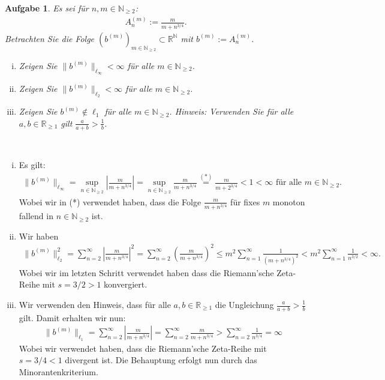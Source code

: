 \documentclass[a4paper, 20]{exam}
\newtheorem{ex}{Aufgabe}
\begin{document}
\begin{ex} Es sei für $n,m \in \mathbb{N}_{ \geq 2}$:
\begin{align*}
A_n^{(m)}:= \frac{m}{m+n^{3/4}}.
\end{align*}
Betrachten Sie die Folge $(b^{(m)})_{m \in \mathbb{N}_{ \geq 2}} \subset \mathbb{R}^\mathbb{N}$ mit $b^{(m)}:= A_n^{(m)}$. 
\begin{enumerate}[i)]
\item Zeigen Sie $\|b^{(m)}\|_{ \ell_\infty} < \infty$ für alle $m \in \mathbb{N}_{ \geq 2}$. 
\item Zeigen Sie $\| b^{(m)}\|_{ \ell_2} < \infty$ für alle $m \in \mathbb{N}_{ \geq 2}$. 
\item Zeigen Sie $b^{(m)} \notin \ell_1$ für alle $m \in \mathbb{N}_{ \geq 2}$. Hinweis: Verwenden Sie für alle $a,b \in \mathbb{R}_{ \geq 1}$ gilt  $\frac{a}{a+b} > \frac{1}{b}.$
\end{enumerate}
\end{ex}

\begin{solution} \
\begin{enumerate}[i)]
\item Es gilt:
\begin{align*}
\|b^{(m)}\|_{ \ell_\infty} = \sup_{n \in \mathbb{N}_{ \geq 2}} \left| \frac{m}{m+n^{3/4}}\right| = \sup_{n \in \mathbb{N}_{ \geq 2}} \frac{m}{m+n^{3/4}} \overset{(*)}= \frac{m}{m+2^{3/4}}<1< \infty \text{ für alle }m \in \mathbb{N}_{ \geq 2}.
\end{align*}
Wobei wir in (*) verwendet haben, dass die Folge $\frac{m}{m+n^{3/4}}$ für fixes $m$ monoton fallend in $n \in \mathbb{N}_{ \geq 2}$ ist. 
\item Wir haben 
\begin{align*}
\|b^{(m)}\|_{ \ell_2}^2 = \sum_{n=2}^\infty \left| \frac{m}{m+n^{3/4}}\right|^2 = \sum_{n=2}^\infty \left( \frac{m}{m+n^{3/4}}\right)^2 \leq m^2 \sum_{n=1}^\infty \frac{1}{(m+n^{3/4})^2}< m^2 \sum_{n=1}^\infty \frac{1}{n^{3/2}}< \infty.
\end{align*}
Wobei wir im letzten Schritt verwendet haben dass die Riemann'sche Zeta-Reihe mit $s=3/2 >1$ konvergiert. 
\item Wir verwenden den Hinweis, dass für alle $a,b \in \mathbb{R}_{ \geq 1}$ die Ungleichung $\frac{a}{a+b}> \frac{1}{b}$ gilt. Damit erhalten wir nun:
\begin{align*}
\|b^{(m)}\|_{ \ell_1} = \sum_{n=2}^\infty \left| \frac{m}{m+n^{3/4}}\right| = \sum_{n=2}^\infty \frac{m}{m+n^{3/4}}> \sum_{n=2}^\infty \frac{1}{n^{3/4}} = \infty
\end{align*}
Wobei wir verwendet haben, dass die Riemann'sche Zeta-Reihe mit $s=3/4 < 1$ divergent ist. Die Behauptung erfolgt nun durch das Minorantenkriterium. 
\end{enumerate}
\end{solution}
\end{document}
